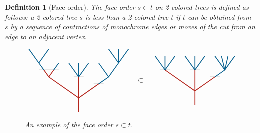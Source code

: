 \documentclass[twoside, 11pt]{amsart}
\newtheorem{definition}{Definition}[section]
\theoremstyle{remark}
\begin{document}
\begin{definition}[Face order]\leavevmode
The \emph{face order} $s\subset t$ on 2-colored trees is defined as follows: a 2-colored tree $s$ is less than a 2-colored tree $t$ if $t$ can be obtained from $s$ by a sequence of contractions of monochrome edges or moves of the cut from an edge to an adjacent vertex.

\begin{figure}[h]
\[\vcenter{\hbox{
\begin{tikzpicture}[yscale=0.7,xscale=1]
\draw[very thick, MidnightBlue] (-2.5,3.5)--(-2,2.5);
\draw[very thick, MidnightBlue] (-1.5,3.5)--(-2,2.5);
\draw[very thick, MidnightBlue] (-2,2.5) -- (-1.75,2);
\draw[very thick, MidnightBlue] (-1.25, 2) -- (-1,2.5);
\draw[very thick, MidnightBlue] (-0.5,2.5) -- (0,1.5);
\draw[very thick, MidnightBlue] (0,1.5)--(0,2.5);
\draw[very thick, MidnightBlue] (0,1.5)--(0.5,2.5);
\draw[very thick, MidnightBlue] (1,1)--(1.5,1.5);
\draw[very thick, MidnightBlue] (1.5,1.5)--(1,2.5);
\draw[very thick, MidnightBlue] (1.5,1.5)--(2,2.5);
\draw[very thick, MidnightBlue] (2,2.5)--(1.5,3.5);
\draw[very thick, MidnightBlue] (2,2.5)--(2,3.5);
\draw[very thick, MidnightBlue] (2,2.5)--(2.5,3.5);
\draw[very thick, BrickRed] (0,-1)--(0, 1.5); 
\draw[very thick, BrickRed] (0,0)--(-1.5,1.5);
\draw[very thick, BrickRed] (-1.5,1.5)--(-1.75, 2); 
\draw[very thick, BrickRed] (-1.5,1.5)--(-1.25, 2); 
\draw[very thick, BrickRed] (0,0)--(1, 1);
\draw (-2,2) to (-1,2); 
\draw (-0.25,1.5)-- (0.25, 1.5) ; 
\draw (0.75,1) to (1.25,1);
\end{tikzpicture}}}
\quad \subset \quad
\vcenter{\hbox{
\begin{tikzpicture}[yscale=0.7,xscale=1]
\draw[very thick, MidnightBlue] (-1.5,1.5)--(-1.5,2.5);
\draw[very thick, MidnightBlue] (-2,2.5) -- (-1.75,2);
\draw[very thick, MidnightBlue] (-1.25, 2) -- (-1,2.5);
\draw[very thick, MidnightBlue] (-0.5,2.5) -- (0,1.5);
\draw[very thick, MidnightBlue] (0,1.5)--(0,2.5);
\draw[very thick, MidnightBlue] (0,1.5)--(0.5,2.5);
\draw[very thick, MidnightBlue] (1,1)--(1.5,1.5);
\draw[very thick, MidnightBlue] (1.5,1.5)--(1,2.5);
\draw[very thick, MidnightBlue] (1.5,1.5)--(1.33,2.5);
\draw[very thick, MidnightBlue] (1.5,1.5)--(1.66,2.5);
\draw[very thick, MidnightBlue] (1.5,1.5)--(2,2.5);
\draw[very thick, MidnightBlue] (-1.5,1.5)--(-1.75, 2); 
\draw[very thick, MidnightBlue] (-1.5,1.5)--(-1.25, 2); 
\draw[very thick, BrickRed] (0,-1)--(0, 1.5); 
\draw[very thick, BrickRed] (0,0)--(-1.5,1.5);
\draw[very thick, BrickRed] (0,0)--(1, 1);
\draw (-1.75,1.5) to (-1.25,1.5); 
\draw (-0.25,1.5) to (0.25,1.5); 
\draw (0.75,1) to (1.25,1);
\end{tikzpicture}}}
\]
\caption{An example of the face order $s\subset t$.}
\label{Fig2:InclusionOrder}
\end{figure}

\end{definition}
\end{document}
